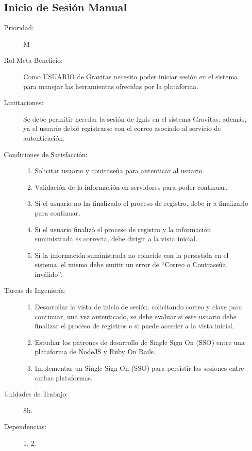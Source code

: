 \newpage

\subsection{Inicio de Sesión Manual}

\begin{description}
    \item[Prioridad:] M
    \item[Rol-Meta-Beneficio:] Como USUARIO de Gravitas necesito poder iniciar sesión en el sistema para manejar las herramientas ofrecidas por la plataforma.
    \item[Limitaciones:] Se debe permitir heredar la sesión de Ignis en el sistema Gravitas; además, ya el usuario debió registrarse con el correo asociado al servicio de autenticación.
    \item[Condiciones de Satisfacción:] \hfill
        \begin{enumerate}
            \item Solicitar usuario y contraseña para autenticar al usuario.
            \item Validación de la información en servidores para poder continuar.
            \item Si el usuario no ha finalizado el proceso de registro, debe ir a finalizarlo para continuar.
            \item Si el usuario finalizó el proceso de registro y la información suministrada es correcta, debe dirigir a la vista inicial.
            \item Si la información suministrada no coincide con la persistida en el sistema, el mismo debe emitir un error de “Correo o Contraseña inválido”.
        \end{enumerate}
    \item[Tareas de Ingeniería:] \hfill
        \begin{enumerate}
            \item Desarrollar la vista de inicio de sesión, solicitando correo y clave para continuar, una vez autenticado, se debe evaluar si este usuario debe finalizar el proceso de registros o si puede acceder a la vista inicial.
            \item Estudiar los patrones de desarrollo de Single Sign On (SSO) entre una plataforma de NodeJS y Ruby On Rails.
            \item Implementar un Single Sign On (SSO) para persistir las sesiones entre ambas plataformas.
        \end{enumerate}
    \item[Unidades de Trabajo:] 8h.
    \item[Dependencias:] 1, 2.
\end{description}

